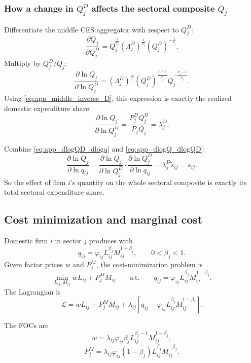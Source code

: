 \subsubsection{How a change in $Q_j^D$ affects the sectoral composite $Q_j$}

Differentiate the middle CES aggregator with respect to $Q_j^D$:
\[
\frac{\partial Q_j}{\partial Q_j^D}
=
Q_j^{\frac{1}{\nu_j}}
(\Lambda_j^D)^{\frac{1}{\nu_j}}
(Q_j^D)^{-\frac{1}{\nu_j}}.
\]
Multiply by $Q_j^D/Q_j$:
\[
\frac{\partial \ln Q_j}{\partial \ln Q_j^D}
=
(\Lambda_j^D)^{\frac{1}{\nu_j}} (Q_j^D)^{\frac{\nu_j-1}{\nu_j}} Q_j^{-\frac{\nu_j-1}{\nu_j}}.
\]
Using \eqref{eq:app_middle_inverse_D}, this expression is exactly the realized domestic expenditure share:
\begin{equation}
\frac{\partial \ln Q_j}{\partial \ln Q_j^D}
=
\frac{P_j^D Q_j^D}{P_j Q_j}
=
\lambda_j^D.
\label{eq:app_dlogQ_dlogQD}
\end{equation}

Combine \eqref{eq:app_dlogQD_dlogq} and \eqref{eq:app_dlogQ_dlogQD}:
\begin{equation}
\frac{\partial \ln Q_j}{\partial \ln q_{ij}}
=
\frac{\partial \ln Q_j}{\partial \ln Q_j^D}
\cdot
\frac{\partial \ln Q_j^D}{\partial \ln q_{ij}}
=
\lambda_j^D \tilde{s}_{ij}
=
s_{ij}.
\label{eq:app_dlogQ_dlogq}
\end{equation}
So the effect of firm $i$'s quantity on the whole sectoral composite is exactly its total sectoral expenditure share.

\subsection{Cost minimization and marginal cost}

Domestic firm $i$ in sector $j$ produces with
\[
q_{ij} = \varphi_{ij} L_{ij}^{\beta_j} M_{ij}^{1-\beta_j},
\qquad 0 < \beta_j < 1.
\]
Given factor prices $w$ and $P_j^M$, the cost-minimization problem is
\[
\min_{L_{ij},M_{ij}}
w L_{ij} + P_j^M M_{ij}
\qquad \text{s.t.} \qquad
q_{ij} = \varphi_{ij} L_{ij}^{\beta_j} M_{ij}^{1-\beta_j}.
\]
The Lagrangian is
\[
\mathcal{L}
=
w L_{ij} + P_j^M M_{ij}
+
\lambda_{ij}
\left[
q_{ij} - \varphi_{ij} L_{ij}^{\beta_j} M_{ij}^{1-\beta_j}
\right].
\]

The FOCs are
\begin{equation}
w
=
\lambda_{ij} \varphi_{ij} \beta_j L_{ij}^{\beta_j-1} M_{ij}^{1-\beta_j},
\label{eq:app_cost_foc_L}
\end{equation}
\begin{equation}
P_j^M
=
\lambda_{ij} \varphi_{ij} (1-\beta_j) L_{ij}^{\beta_j} M_{ij}^{-\beta_j}.
\label{eq:app_cost_foc_M}
\end{equation}


